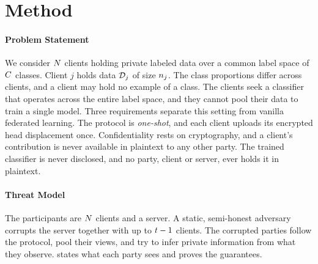 %

\section{Method}
\label{sec:method}
\label{sec:setting}

\paragraph{Problem Statement} We consider $N$ clients holding private labeled
data over a common label space of $C$ classes. Client $j$ holds data $\mathcal{D}_j$ of
size $n_j$. The class proportions differ across clients, and a client may hold no
example of a class. The clients seek a classifier that operates across the entire
label space, and they cannot pool their data to train a single model. Three
requirements separate this setting from vanilla federated learning. The protocol
is \emph{one-shot}, and each client uploads its encrypted head displacement once.
Confidentiality rests on cryptography, and a client's contribution is never
available in plaintext to any other party. The trained classifier is never
disclosed, and no party, client or server, ever holds it in plaintext.

\paragraph{Threat Model} The participants are $N$ clients and a server. A
static, semi-honest adversary corrupts the server together with up to $t-1$
clients. The corrupted parties follow the protocol, pool their views, and try to
infer private information from what they observe.  states what
each party sees and proves the guarantees.

